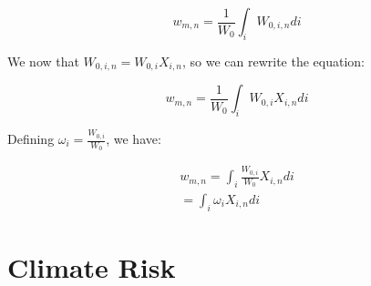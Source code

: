 \begin{equation}
    w_{m,n} = \frac{1}{W_0} \int_i W_{0,i,n} di
\end{equation}

We now that $W_{0,i,n} = W_{0,i} X_{i,n}$, so we can rewrite the equation:

\begin{equation}
    w_{m,n} = \frac{1}{W_0} \int_i W_{0,i} X_{i,n} di
\end{equation}

Defining $\omega_i = \frac{W_{0,i}}{W_0}$, we have:

\begin{equation}
    \begin{aligned}
    w_{m,n} = \int_i \frac{W_{0,i}}{W_0} X_{i,n} di\\
    = \int_i \omega_i X_{i,n} di
    \end{aligned}
\end{equation}

\section{Climate Risk}